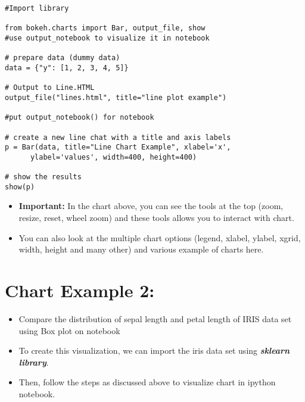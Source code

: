 \documentclass[a4paper,12pt]{article}
\begin{document}
%
%
%
%

\newpage

\begin{verbatim}
#Import library

from bokeh.charts import Bar, output_file, show 
#use output_notebook to visualize it in notebook

# prepare data (dummy data)
data = {"y": [1, 2, 3, 4, 5]}

# Output to Line.HTML
output_file("lines.html", title="line plot example") 

#put output_notebook() for notebook

# create a new line chat with a title and axis labels
p = Bar(data, title="Line Chart Example", xlabel='x', 
      ylabel='values', width=400, height=400)

# show the results
show(p)
\end{verbatim}

\newpage
\begin{itemize}
\item \textbf{Important:} In the chart above,  you can see the tools at the top (zoom, resize, reset, wheel zoom) and these 
tools allows you to interact with chart. 
\item You can also look at the multiple chart options (legend, xlabel, ylabel, xgrid, width, height and many other) and 
various example of charts here.
\end{itemize}




\section*{Chart Example 2: }
\begin{itemize}
\item Compare the distribution of sepal length and petal length of IRIS data set using 
Box plot on notebook

\item To create this visualization, we can import the iris data set using \textbf{\textit{sklearn library}}. 
\item Then, 
follow the steps as discussed above to visualize chart in ipython notebook.

\end{itemize}
\end{document}
